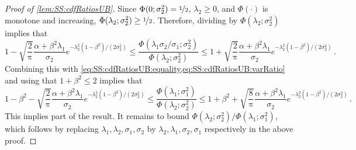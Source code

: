 \documentclass[11pt,letterpaper]{article}
\theoremstyle{plain}
\theoremstyle{definition}
\theoremstyle{remark}
\newcommand{\inparen}[1]{\ensuremath{\left(#1\right)}}
\newcommand{\sfrac}[2]{{#1/#2}}
\newcommand{\nfrac}[2]{\nicefrac{#1}{#2}}
\renewcommand{\pi}{\uppi}
\begin{document}
{{{\begin{proof}[Proof of \cref{lem:SS:cdfRatiosUB}]
                Since $\Phi(0;\sigma_2^2)=\nfrac{1}{2}$,
                $\lambda_2\geq 0$, and $\Phi(\cdot)$ is monotone and increasing, $\Phi(\lambda_2;\sigma_2^2)\geq \nfrac{1}{2}$.
                Therefore, dividing by $\Phi(\lambda_2;\sigma_2^2)$ implies that 
                \[
                    1 
                    - \sqrt{\frac{2}{\pi}}\frac{\alpha+\beta^2\lambda_1}{\sigma_2}
                     e^{-\lambda_2^2(1-\beta^2)/(2\sigma_2^2)}
                    \leq 
                    \frac{\Phi(\lambda_1\sigma_2/\sigma_1;\sigma_2^2) }{\Phi\inparen{\lambda_2; \sigma_2^2}}
                    \leq 1 
                    + \sqrt{\frac{2}{\pi}}\frac{\alpha+\beta^2\lambda_1}{\sigma_2}
                     e^{-\lambda_2^2(1-\beta^2)/(2\sigma_2^2)}\,.
                \]
                Combining this with \cref{eq:SS:cdfRatiosUB:equality,eq:SS:cdfRatiosUB:varRatio} and using that $1+\beta^2\leq 2$ implies that 
                \[
                    1 
                    -\beta^2 - \sqrt{\frac{2}{\pi}}\frac{\alpha+\beta^2\lambda_1}{\sigma_2}
                     e^{-\lambda_2^2(1-\beta^2)/(2\sigma_2^2)}
                    \leq 
                    \frac{\Phi(\lambda_1;\sigma_1^2)}{\Phi(\lambda_2;\sigma_2^2)}
                    \leq 1 
                    + \beta^2 + \sqrt{\frac{8}{\pi}}\frac{\alpha+\beta^2\lambda_1}{\sigma_2}
                     e^{-\lambda_2^2(1-\beta^2)/(2\sigma_2^2)}\,.
                \]
                This implies part of the result.
                It remains to bound $\sfrac{\Phi(\lambda_2;\sigma_2^2)}{\Phi(\lambda_1;\sigma_1^2)}$, which follows by replacing $\lambda_1,\lambda_2,\sigma_1,\sigma_2$ by $\lambda_2,\lambda_1,\sigma_2,\sigma_1$ respectively in the above proof.
            \end{proof}




    

    
}}}
\end{document}
